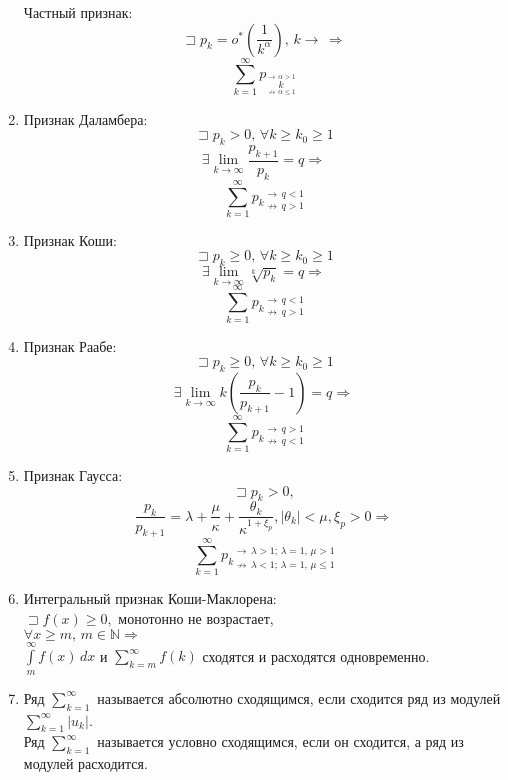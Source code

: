 \documentclass[oneside,final,12pt]{extreport}
\begin{document}
\begin{enumerate}
    Частный признак: \\
\[ \sqsupset p_k = o^*(\frac{1}{k^\alpha}), \, k \rightarrow \, \Rightarrow\]
    \[ \sum\limits_{k = 1}^\infty p_k \limits_{\not\rightarrow \, \alpha \leqslant 1}^{\rightarrow \, \alpha > 1} \]
    
    \item Признак Даламбера: \\
    \[ \sqsupset p_k > 0, \, \forall k \geqslant k_0 \geqslant 1 \]
    \[\exists\lim\limits_{k\to\infty}\frac{p_{k+1}}{p_k} = q  \Rightarrow\]
    \[ \sum\limits_{k=1}^\infty p_k \, \limits_{\not\rightarrow \, q > 1}^{\rightarrow \, q < 1} \]
    
    \item Признак Коши:
    \[ \sqsupset p_k \geqslant 0, \, \forall k \geqslant k_0 \geqslant 1 \]
    \[\exists\lim\limits_{k\to\infty} \sqrt[k]{p_k} = q  \Rightarrow\]
    \[ \sum\limits_{k=1}^\infty p_k \, \limits_{\not\rightarrow \, q > 1}^{\rightarrow \, q < 1} \]
    
    \item Признак Раабе:
    \[ \sqsupset p_k \geqslant 0, \, \forall k \geqslant k_0 \geqslant 1 \]
    \[\exists\lim\limits_{k\to\infty} k(\frac{p_k}{p_{k+1}} - 1) = q  \Rightarrow\]
    \[ \sum\limits_{k=1}^\infty p_k \, \limits_{\not\rightarrow \, q < 1}^{\rightarrow \, q > 1} \]
    
    \item Признак Гаусса:
    \[ \sqsupset p_k >0, \]
    \[ \frac{p_k}{p_{k + 1}} = \lambda + \frac{\mu}{\kappa} + \frac{\theta_k}{\kappa^{1 + \xi_p}}, |\theta_k| < \mu, \xi_p > 0 \Rightarrow \]
    \[ \sum\limits_{k=1}^\infty p_k \, \limits_{\not\rightarrow \, \lambda < 1; \, \lambda = 1, \,\mu \leqslant 1 }^{\rightarrow \, \lambda > 1; \, \lambda = 1, \, \mu > 1} \]
    
    \item Интегральный признак Коши-Маклорена: \\
    \( \sqsupset f(x) \geqslant 0, \) монотонно не возрастает, \\
    \( \forall x \geqslant m, \, m \in \mathbb{N} \Rightarrow \) \\
    \( \int\limits_m^\infty f(x) \, dx \) и \( \sum\limits_{k = m}^\infty f(k) \) сходятся и расходятся одновременно.
    
    \item Ряд \( \sum\limits_{k=1}^\infty \) называется абсолютно сходящимся, если сходится ряд из модулей \( \sum\limits_{k=1}^\infty | u_k | \). \\
    Ряд \( \sum\limits_{k=1}^\infty \) называется условно сходящимся, если он сходится, а ряд из модулей расходится.
    

\end{enumerate}
\end{document}
